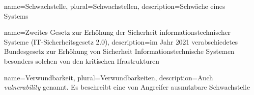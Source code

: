  {
    name={Schwachstelle},
    plural={Schwachstellen},
    description={Schwäche eines Systems \citep{Wendzel_IS}}
}

 {
    name={Zweites Gesetz zur Erhöhung der Sicherheit informationstechnischer Systeme (IT-Sicherheitsgesetz 2.0)},
    description={im Jahr 2021 verabschiedetes Bundesgesetz zur Erhöhung von Sicherheit Informationstechnische Systemen besonders solchen von den kritischen Ifrastrukturen  \citep{Harmes_ITSG}}
}

 {
    name={Verwundbarkeit},
    plural={Verwundbarkeiten},
    description={Auch \textit{vulnerability} genannt. Es beschreibt eine von Angreifer ausnutzbare Schwachstelle \citep{Wendzel_IS}}
}










    